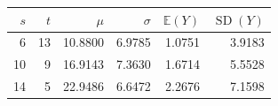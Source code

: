 \begin{tabular}{rrrrrr}
\toprule
$s$ & $t$ & $\mu$ & $\sigma$ & $\mathbb E(Y)$ & $\operatorname{SD}(Y)$ \\
\midrule
6 & 13 & 10.8800 & 6.9785 & 1.0751 & 3.9183 \\
10 & 9 & 16.9143 & 7.3630 & 1.6714 & 5.5528 \\
14 & 5 & 22.9486 & 6.6472 & 2.2676 & 7.1598 \\
\bottomrule
\end{tabular}
